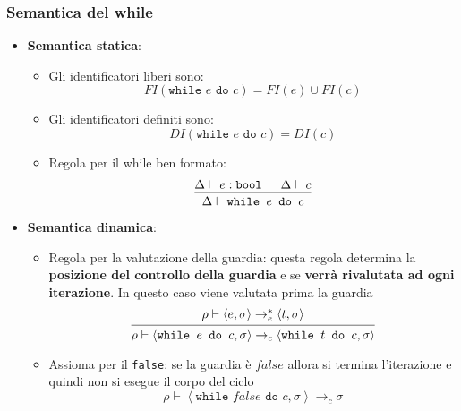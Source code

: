 \documentclass[a4paper]{article}
\begin{document}
\subsubsection{Semantica del while}
\begin{itemize}
  \item \textbf{Semantica statica}:
    \begin{itemize}
      \item Gli identificatori liberi sono:
        \[
          FI(\texttt{while } e \texttt{ do } c) = FI(e) \cup FI(c)
        \]

      \item Gli identificatori definiti sono:
        \[
          DI(\texttt{while } e \texttt{ do } c) = DI(c)
        \]

      \item Regola per il while ben formato:
        \[
          \begin{prooftree}
            \hypo{ 
              \Delta \vdash e : \texttt{bool} 
            }
            \hypo{ 
              \Delta \vdash c
            }
            \infer2{ 
              \Delta \vdash \texttt{while } e \texttt{ do } c
            }
          \end{prooftree}
        \]
    \end{itemize}

  \item \textbf{Semantica dinamica}:
    \begin{itemize}
      \item Regola per la valutazione della guardia: questa regola determina la
        \textbf{posizione del controllo della guardia} e se \textbf{verrà rivalutata
        ad ogni iterazione}. In questo caso viene valutata prima la guardia
        \[
        \begin{prooftree}
          \hypo{ 
            \rho \vdash \left< e, \sigma  \right> \to^*_e \left< t, \sigma \right>
          }
          \infer1{ 
            \rho \vdash \left< \texttt{while } e \texttt{ do } c, \sigma  \right>
            \to_c
            \left< \texttt{while } t \texttt{ do } c, \sigma  \right>
          }
        \end{prooftree}
        \] 

      \item Assioma per il \texttt{false}: se la guardia è \( false \) allora
        si termina l'iterazione e quindi non si esegue il corpo del ciclo
        \[
          \rho \vdash \left< \texttt{while } false \texttt{ do } c, \sigma  \right>
          \to_c
          \sigma
        \]


\end{itemize}
\end{itemize}
\end{document}
